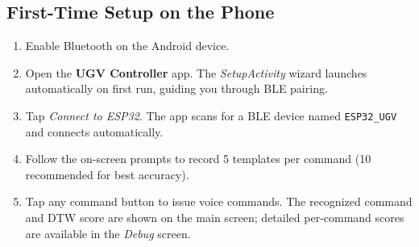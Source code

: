\documentclass[conference]{IEEEtran}
\begin{document}
		
		
		
		
	
	\subsection{First-Time Setup on the Phone}
	
	\begin{enumerate}
		\item Enable Bluetooth on the Android device.
		\item Open the \textbf{UGV Controller} app.
		The \textit{SetupActivity} wizard launches automatically on first
		run, guiding you through BLE pairing.
		\item Tap \textit{Connect to ESP32}. The app scans for a BLE device
		named \texttt{ESP32\_UGV} and connects automatically.
		\item Follow the on-screen prompts to record 5 templates per command
		(10 recommended for best accuracy).
		\item Tap any command button to issue voice commands. The recognized
		command and DTW score are shown on the main screen; detailed
		per-command scores are available in the \textit{Debug} screen.
	\end{enumerate}
	
\end{document}
